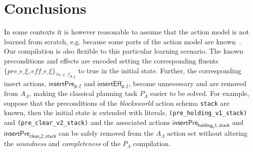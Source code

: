 \documentclass{article}
\begin{document}
\section{Conclusions}
\label{sec:conclusions}
In some contexts it is however reasonable to assume that the action model is not learned from scratch, e.g. because some parts of the action model are known~\cite{ZhuoNK13,sreedharan2018handling,pereira2018heuristic}. Our compilation is also flexible to this particular learning scenario. The known preconditions and effects are encoded setting the corresponding fluents $\{pre\_e\_\xi, eff\_e\_\xi\}_{\forall e\in{\mathcal I}_{\Psi,\xi}}$ to true in the initial state. Further, the corresponding insert actions, $\mathsf{insertPre_{p,\xi}}$ and $\mathsf{insertEff_{p,\xi}}$, become unnecessary and are removed from $A_{\Lambda}$, making the classical planning task $P_{\Lambda}$ easier to be solved. For example, suppose that the preconditions of the {\em blocksworld} action schema {\tt stack} are known, then the initial state is extended with literals, {\small\tt(pre\_holding\_v1\_stack)} and {\small\tt(pre\_clear\_v2\_stack)} and the associated actions $\mathsf{insertPre_{holding_v1,stack}}$ and $\mathsf{insertPre_{clear_v2,stack}}$ can be safely removed from the $A_{\Lambda}$ action set without altering the {\em soundness} and {\em completeness} of the $P_{\Lambda}$ compilation.



\end{document}
